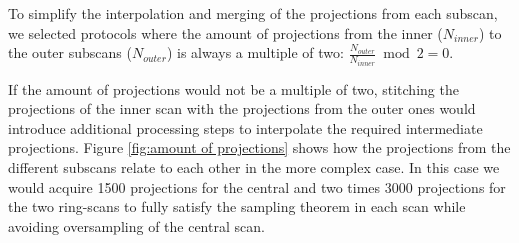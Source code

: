To simplify the interpolation and merging of the projections from each subscan, we selected protocols where the amount of projections from the inner ($N_{inner}$) to the outer subscans ($N_{outer}$) is always a multiple of two: $\frac{N_{outer}}{N_{inner}} \bmod 2 = 0$.

If the amount of projections would not be a multiple of two, stitching the projections of the inner scan with the projections from the outer ones would introduce additional processing steps to interpolate the required intermediate projections. Figure \ref{fig:amount of projections} shows how the projections from the different subscans relate to each other in the more complex case. In this case we would acquire 1500 projections for the central and two times 3000 projections for the two ring-scans to fully satisfy the sampling theorem in each scan while avoiding oversampling of the central scan. 

